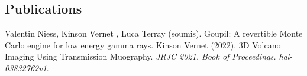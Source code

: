 \documentclass[
	10pt,
]{FreemanCV}
\begin{document}
\begin{paracol}{2}
\section{Publications}
Valentin Niess, Kinson Vernet , Luca Terray (soumis). Goupil: A revertible Monte Carlo engine for low energy gamma rays.
\medskip
\newline
Kinson Vernet (2022). 3D Volcano Imaging Using Transmission Muography. \textit{JRJC 2021. Book of Proceedings. hal-03832762v1}.
\medskip

\end{paracol}
\end{document}
